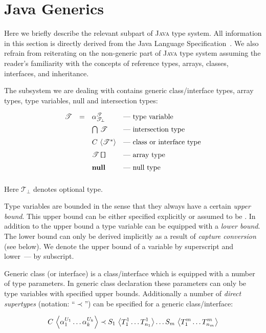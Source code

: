 \section{Java Generics}

Here we briefly describe the relevant subpart of \textsc{Java} type system. All
information in this section is directly derived from the Java Language Specification~\cite{JLS}.
We also refrain from reiterating on the non-generic part of \textsc{Java} type system assuming the reader's familiarity
with the concepts of reference types, arrays, classes, interfaces, and inheritance.

The subsystem we are dealing with contains generic class/interface types, array types,
type variables, null and intersection types:

\[
\begin{array}{rcll}
  \mathscr{T} & = & \alpha^\mathscr{T}_\mathscr{T_\bot}&\mbox{--- type variable}\\[2mm]
              &   & \bigcap\,\mathscr{T}           &\mbox{--- intersection type}\\[2mm]
              &   & {C}\,\left<{\mathscr{T}^*}\right>         &\mbox{--- class or interface type}\\[2mm]
              &   & \mathscr{T}\mbox{\texttt{[]}}    &\mbox{--- array type}\\[2mm]
              &   & \mathbf{null}                   &\mbox{--- null type}\\[2mm]
\end{array}
\]

Here $\mathscr{T}_\bot$ denotes optional type.

Type variables are bounded in the sense that they always have a certain \emph{upper bound}. This upper
bound can be either specified explicitly or assumed to be . In addition
to the upper bound a type variable can be equipped with a \emph{lower bound}. The lower bound can only
be derived implicitly as a result of \emph{capture conversion} (see below). We denote the upper bound of a variable
by  superscript and lower~--- by subscript.

Generic class (or interface) is a class/interface which is equipped with a number of
type parameters. In generic class declaration these parameters can only be type
variables with specified upper bounds. Additionally a number of \emph{direct supertypes} (notation: ``$\prec$'')
can be specified for a generic class/interface:

\[
{C}\,\left<{\alpha_1^{U_1}\dots \alpha_k^{U_k}}\right>\prec{S_1}\,\left<{T^1_1\dots T^1_{n_1}}\right>\dots{S_m}\,\left<{T^m_1\dots T^m_{n_m}}\right>
\]

